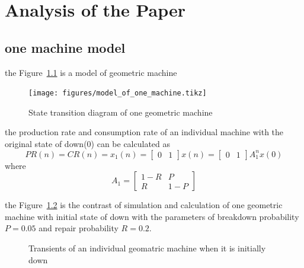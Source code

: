 \chapter{Analysis of the Paper}
\label{C_Kapitel}
\section{one machine model}
\noindent the Figure~\ref{State transition diagram of one geometric machine} is a model of geometric machine

\begin{figure}[!h]
	\centering
	\texttt{[image: figures/model\_of\_one\_machine.tikz]}
	\caption{State transition diagram of one geometric machine}
	\label{State transition diagram of one geometric machine}
\end{figure}

the production rate and consumption rate of an individual machine with the original state of down(0) can be calculated as 
\begin{displaymath} PR(n)=CR(n)=x_1(n)=\begin{bmatrix} 0&1 \end{bmatrix}x(n)=\begin{bmatrix} 0&1 \end{bmatrix}A_1^n
x(0) \end{displaymath}
where
\begin{displaymath} A_1 = \begin{bmatrix} 1-R&P\\R&1-P \end{bmatrix} \end{displaymath}

the Figure~\ref{Transients of an individual geomatric machine when it is initially down} is the contrast of simulation and calculation of one geometric machine with initial state of down with the parameters of breakdown
probability $P = 0.05$ and repair probability $R = 0.2$.

\begin{figure}[!h]
	\centering
	\caption{Transients of an individual geomatric machine when it is initially down}
	\label{Transients of an individual geomatric machine when it is initially down}
\end{figure}

